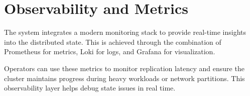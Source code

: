 

\section{Observability and Metrics}
\label{sec:observability}
The system integrates a modern monitoring stack to provide real-time insights into the distributed state. This is achieved through the combination of Prometheus for metrics, Loki for logs, and Grafana for visualization.

Operators can use these metrics to monitor replication latency and ensure the cluster maintains progress during heavy workloads or network partitions. This observability layer helps debug state issues in real time.

